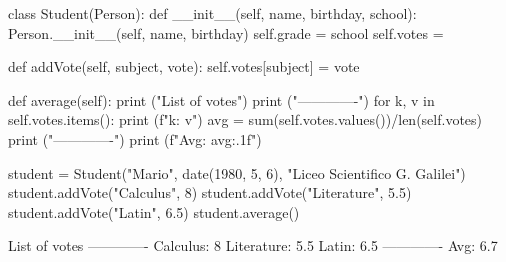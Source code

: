 \cprotEnv\begin{solution}
\begin{ipython}
class Student(Person):
    def __init__(self, name, birthday, school):
        Person.__init__(self, name, birthday)
        self.grade = school
        self.votes = {}

    def addVote(self, subject, vote):
        self.votes[subject] = vote

    def average(self):
        print ("List of votes")
        print ("-------------")
        for k, v in self.votes.items():
            print (f"{k}: {v}")
        avg = sum(self.votes.values())/len(self.votes)
        print ("-------------")
        print (f"Avg: {avg:.1f}")

student = Student("Mario", date(1980, 5, 6), "Liceo Scientifico G. Galilei")
student.addVote("Calculus", 8)
student.addVote("Literature", 5.5)
student.addVote("Latin", 6.5)
student.average()
\end{ipython}
\begin{ioutput}
List of votes
-------------
Calculus: 8
Literature: 5.5
Latin: 6.5
-------------
Avg: 6.7
\end{ioutput}
\end{solution}
